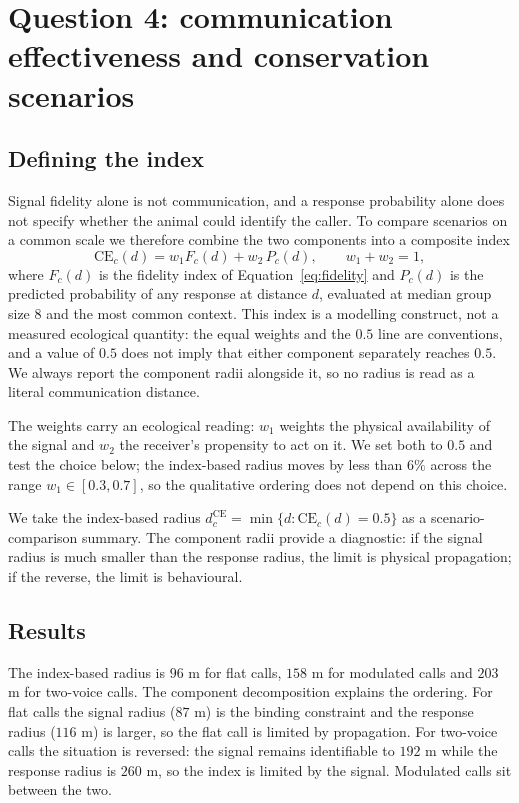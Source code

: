 \documentclass{apmcmthesis}
\begin{document}
\section{Question 4: communication effectiveness and conservation scenarios}\label{sec:q4}

\subsection{Defining the index}

Signal fidelity alone is not communication, and a response probability alone does not
specify whether the animal could identify the caller. To compare scenarios on a common
scale we therefore combine the two components into a composite index
\begin{equation}
\mathrm{CE}_c(d)=w_1 F_c(d)+w_2\,P_c(d),
\qquad w_1+w_2=1,
\label{eq:ce}
\end{equation}
where $F_c(d)$ is the fidelity index of Equation~\eqref{eq:fidelity} and $P_c(d)$ is the
predicted probability of any response at distance $d$, evaluated at median group size $8$
and the most common context. This index is a modelling construct, not a measured
ecological quantity: the equal weights and the $0.5$ line are conventions, and a value of
$0.5$ does not imply that either component separately reaches $0.5$. We always report the
component radii alongside it, so no radius is read as a literal communication distance.

The weights carry an ecological reading: $w_1$ weights the physical availability of the
signal and $w_2$ the receiver's propensity to act on it. We set both to $0.5$ and test
the choice below; the index-based radius moves by less than $6\%$ across the range
$w_1\in[0.3,0.7]$, so the qualitative ordering does not depend on this choice.

We take the index-based radius
$d^{\mathrm{CE}}_c=\min\{d:\mathrm{CE}_c(d)=0.5\}$ as a scenario-comparison summary. The
component radii provide a diagnostic: if the signal radius is much smaller than the
response radius, the limit is physical propagation; if the reverse, the limit is
behavioural.



\subsection{Results}

The index-based radius is $96$ m for flat calls, $158$ m for modulated calls and $203$ m for
two-voice calls. The component decomposition explains the ordering. For flat calls the
signal radius ($87$ m) is the binding constraint and the response radius ($116$ m) is
larger, so the flat call is limited by propagation. For two-voice calls the situation is
reversed: the signal remains identifiable to $192$ m while the response radius is $260$ m,
so the index is limited by the signal. Modulated calls sit between the two.
\end{document}
